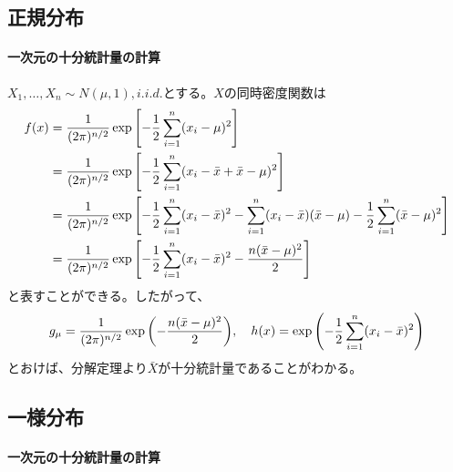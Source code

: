 \subsection{正規分布}

\paragraph{一次元の十分統計量の計算}

\(X_1, \dots, X_n \sim N(\mu, 1), i.i.d.\)とする。\(X\)の同時密度関数は
\begin{equation}
  \begin{aligned}
    f(x) & = \frac{1}{(2\pi)^{n/2}} \exp \qty [ - \frac{1}{2} \sum_{i=1}^{n} (x_i - \mu)^2 ]                                                                                                      \\
         & = \frac{1}{(2\pi)^{n/2}} \exp \qty [ - \frac{1}{2} \sum_{i=1}^{n} (x_i - \bar{x} + \bar{x} - \mu)^2 ]                                                                                  \\
         & = \frac{1}{(2\pi)^{n/2}} \exp \qty [ - \frac{1}{2} \sum_{i=1}^{n} (x_i - \bar{x})^2  - \sum_{i=1}^{n} (x_i - \bar{x})(\bar{x} - \mu)  - \frac{1}{2} \sum_{i=1}^{n} (\bar{x} - \mu)^2 ] \\
         & = \frac{1}{(2\pi)^{n/2}} \exp \qty [ - \frac{1}{2} \sum_{i=1}^{n} (x_i - \bar{x})^2 - \frac{n (\bar{x} - \mu)^2}{2} ]
  \end{aligned}
\end{equation}
と表すことができる。したがって、
\begin{equation}
  g_\mu = \frac{1}{(2\pi)^{n/2}} \exp \qty (- \frac{n (\bar{x} - \mu)^2}{2}), \quad
  h(x) = \exp \qty (- \frac{1}{2} \sum_{i=1}^{n} (x_i - \bar{x})^2)
\end{equation}
とおけば、分解定理より\(\bar{X}\)が十分統計量であることがわかる。

\subsection{一様分布}

\paragraph{一次元の十分統計量の計算}

